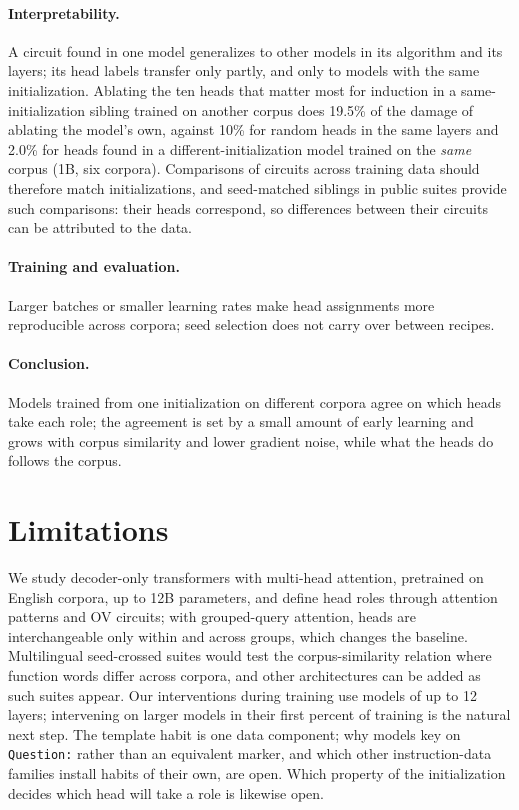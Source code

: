 \documentclass[11pt]{article}
\newcommand{\tmpl}[1]{\texttt{#1}}
\begin{document}
\paragraph{Interpretability.}
A circuit found in one model generalizes to other models in its algorithm and its layers; its head labels transfer only partly, and only to models with the same initialization.
Ablating the ten heads that matter most for induction in a same-initialization sibling trained on another corpus does 19.5\% of the damage of ablating the model's own, against 10\% for random heads in the same layers and 2.0\% for heads found in a different-initialization model trained on the \emph{same} corpus (1B, six corpora).
Comparisons of circuits across training data should therefore match initializations, and seed-matched siblings in public suites provide such comparisons: their heads correspond, so differences between their circuits can be attributed to the data.

\paragraph{Training and evaluation.}
Larger batches or smaller learning rates make head assignments more reproducible across corpora; seed selection does not carry over between recipes.

\paragraph{Conclusion.}
Models trained from one initialization on different corpora agree on which heads take each role; the agreement is set by a small amount of early learning and grows with corpus similarity and lower gradient noise, while what the heads do follows the corpus.

\section*{Limitations}
We study decoder-only transformers with multi-head attention, pretrained on English corpora, up to 12B parameters, and define head roles through attention patterns and OV circuits; with grouped-query attention, heads are interchangeable only within and across groups, which changes the baseline.
Multilingual seed-crossed suites would test the corpus-similarity relation where function words differ across corpora, and other architectures can be added as such suites appear.
Our interventions during training use models of up to 12 layers; intervening on larger models in their first percent of training is the natural next step.
The template habit is one data component; why models key on \tmpl{Question:} rather than an equivalent marker, and which other instruction-data families install habits of their own, are open.
Which property of the initialization decides which head will take a role is likewise open.
\end{document}
